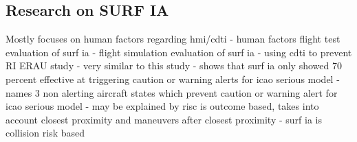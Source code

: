 \subsection{Research on SURF IA}

Mostly focuses on human factors regarding hmi/cdti
- human factors flight test evaluation of surf ia
- flight simulation evaluation of surf ia
- using cdti to prevent RI
\newline
ERAU study
- very similar to this study
- shows that surf ia only showed 70 percent effective at triggering caution or warning alerts for icao serious model
- names 3 non alerting aircraft states which prevent caution or warning alert for icao serious model
- may be explained by risc is outcome based, takes into account closest proximity and maneuvers after closest proximity
- surf ia is collision risk based

